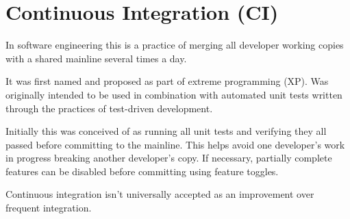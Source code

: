 \section{Continuous Integration (CI)}
\label{sec:Continuous Integration (CI)}

In software engineering this is a practice of merging all developer working copies with a shared mainline several times a day.

It was first named and proposed as part of extreme programming (XP). Was originally intended to be used in combination with automated unit tests written through the practices of test-driven development.

Initially this was conceived of as running all unit tests and verifying they all passed before committing to the mainline. This helps avoid one developer's work in progress breaking another developer's copy. If necessary, partially complete features can be disabled before committing using feature toggles.

Continuous integration isn't universally accepted as an improvement over frequent integration. 
